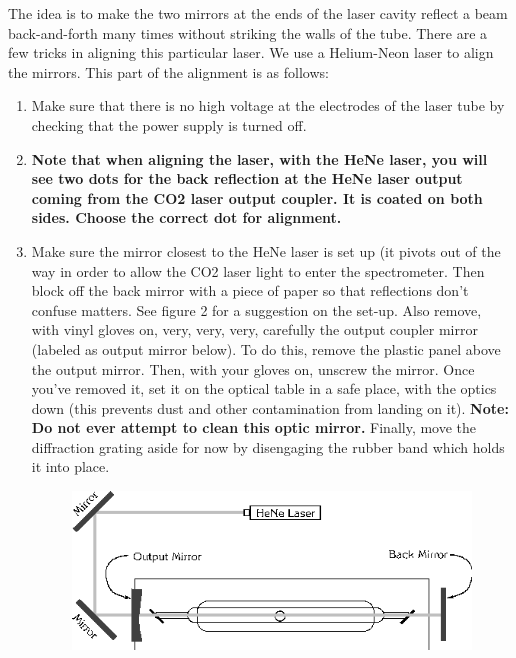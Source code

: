 \documentclass{../lab}
\begin{document}
The idea is to make the two mirrors at the ends of the laser cavity reflect a beam back-and-forth many times without striking the walls of the tube. There are a few tricks in aligning this particular laser. We use a Helium-Neon laser to align the mirrors. This part of the alignment is as follows:

\begin{enumerate}
    \item Make sure that there is no high voltage at the electrodes of the laser tube by checking that the power supply is turned off.
    \item \textbf{Note that when aligning the laser, with the HeNe laser, you will see two dots for the back reflection at the HeNe laser output coming from the CO2 laser output coupler.  It is coated on both sides. Choose the correct dot for alignment.}
    \item Make sure the mirror closest to the HeNe laser is set up (it pivots out of the way in order to allow the CO2 laser light to enter the spectrometer. Then block off the back mirror with a piece of paper so that reflections don't confuse matters. See figure 2 for a suggestion on the set-up. Also remove, with vinyl gloves on, very, very, very, carefully the output coupler mirror (labeled as output mirror below). To do this, remove the plastic panel above the output mirror. Then, with your gloves on, unscrew the mirror. Once you've removed it, set it on the optical table in a safe place, with the optics down (this prevents dust and other contamination from landing on it). \textbf{Note: Do not ever attempt to clean this optic mirror. }Finally, move the diffraction grating aside for now by disengaging the rubber band which holds it into place.




\begin{figure}[h]
    \centering
    \href{http://experimentationlab.berkeley.edu/sites/default/files/images/CO24.gif}{\includegraphics[width=\linewidth]{images/CO24.png}}
    \caption{}
    \label{fig:CO24}
\end{figure}



\end{enumerate}
\end{document}
